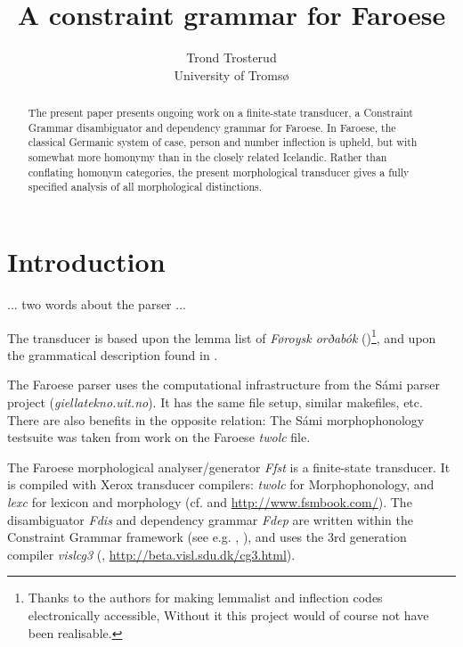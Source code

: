 \documentclass[11pt]{article}
\begin{document}
\title{A constraint grammar for Faroese}
\author{Trond Trosterud \\ 
University of Tromsø}

\date{}

\maketitle{}

\begin{abstract}
The present paper presents ongoing work on a finite-state transducer, a Constraint Grammar disambiguator and dependency grammar for Faroese. In Faroese, the classical Germanic system of case, person and number inflection is upheld, but with somewhat more homonymy than in the closely related Icelandic. Rather than conflating homonym categories, the present morphological transducer gives a fully specified analysis of all morphological distinctions.
\end{abstract}

\section{Introduction} 

... two words about the parser ...

The transducer is based upon the lemma list of \emph{Føroysk orðabók} (\cite{Poulsen98})\footnote{Thanks to the authors for making lemmalist and inflection codes electronically accessible, Without it this project would of course not have been realisable.}, and upon the grammatical description found in \cite{Thr04}. 

The Faroese parser uses the computational infrastructure from the Sámi parser project (\textit{giellatekno.uit.no}). It has the same file setup, similar makefiles, etc. There are also benefits in the opposite relation: The Sámi morphophonology testsuite was taken from work on the Faroese \textit{twolc} file. 

The Faroese morphological analyser/generator \textit{Ffst} is a finite-state transducer. It is compiled with Xerox transducer compilers: \textit{twolc} for Morphophonology, and \textit{lexc} for lexicon and morphology (cf. \cite{Beesley03} and \url{http://www.fsmbook.com/}). The disambiguator \textit{Fdis} and dependency grammar \textit{Fdep} are written within the Constraint Grammar framework (see e.g. \cite{Karlsson90}, \cite{Karlsson95}), and uses the 3rd generation compiler \textit{vislcg3} (\cite{Bick00}, \url{http://beta.visl.sdu.dk/cg3.html}).
\end{document}
